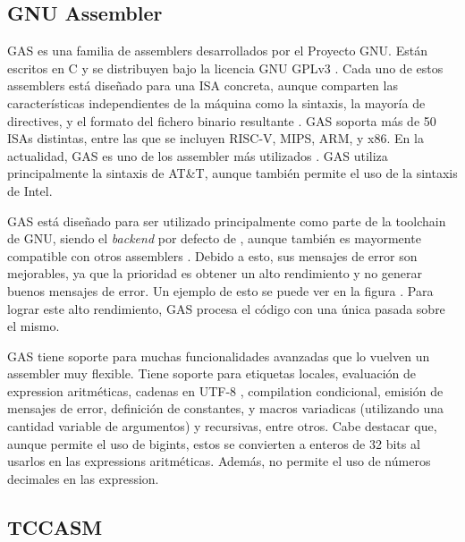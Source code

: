 \subsection{GNU Assembler}

\gls{GAS} \parencite{GNUas} es una familia de \glspl{assembler} desarrollados
por el Proyecto GNU. Están escritos en C y se distribuyen bajo la licencia GNU
GPLv3 \parencite{gpl}. Cada uno de estos \glspl{assembler} está diseñado para
una \gls{ISA} concreta, aunque comparten las características independientes de
la máquina como la sintaxis, la mayoría de \glspl{directive}, y el formato del
fichero binario resultante \parencite{as-manual}. \gls{GAS} soporta más de 50
\glspl{ISA} distintas, entre las que se incluyen RISC-V, MIPS, ARM, y x86. En la
actualidad, \gls{GAS} es uno de los \gls{assembler} más utilizados
\parencite{assembler-usage}. \gls{GAS} utiliza principalmente la sintaxis de
AT\&T, aunque también permite el uso de la sintaxis de Intel.

\gls{GAS} está diseñado para ser utilizado principalmente como parte de la
\gls{toolchain} de GNU, siendo el \textit{backend} por defecto de ,
aunque también es mayormente compatible con otros \glspl{assembler}
\parencite{as-manual}. Debido a esto, sus mensajes de error son mejorables, ya
que la prioridad es obtener un alto rendimiento y no generar buenos mensajes de
error. Un ejemplo de esto se puede ver en la figura . Para
lograr este alto rendimiento, \gls{GAS} procesa el código con una única pasada
sobre el mismo.


\gls{GAS} tiene soporte para muchas funcionalidades avanzadas que lo vuelven un
\gls{assembler} muy flexible. Tiene soporte para etiquetas locales, evaluación
de \gls{expression} aritméticas, cadenas en UTF-8 \parencite{UTF-8},
\gls{compilation} condicional, emisión de mensajes de error, definición de
constantes, y \glspl{macro} variadicas (utilizando una cantidad variable de
argumentos) y recursivas, entre otros. Cabe destacar que, aunque permite el uso
de \glspl{bigint}, estos se convierten a enteros de 32 bits al usarlos en las
\glspl{expression} aritméticas. Además, no permite el uso de números decimales
en las \gls{expression}.

\subsection{TCCASM}

